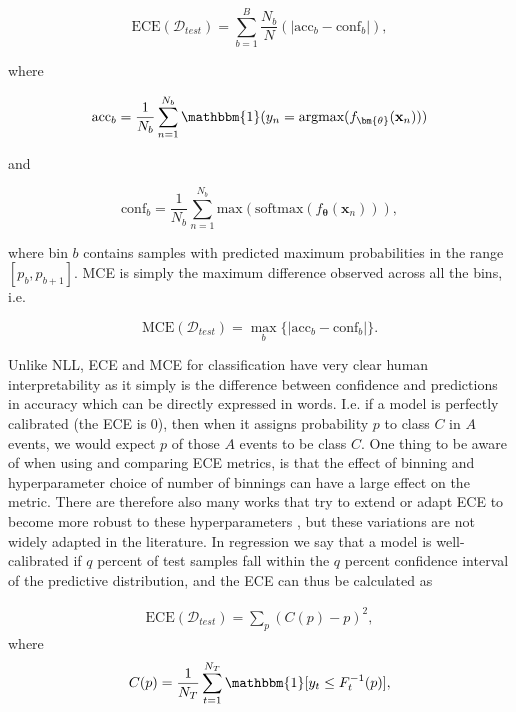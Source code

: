\begin{equation}
    \text{ECE}(\mathcal{D}_{test}) = \sum_{b=1}^{B}\frac{N_b}{N}(|\text{acc}_b - \text{conf}_b|),
\end{equation}

\noindent where 

\begin{equation}
    \text{acc}_b = \frac{1}{N_b}\sum^{N_b}_{n=1}\mathbbm{1}(y_{n}=\text{argmax}(f_{\bm{\theta}}(\mathbf{x}_n)))
\end{equation}

\noindent and

\begin{equation}
    \text{conf}_b = \frac{1}{N_b}\sum^{N_b}_{n=1}\text{max}(\text{softmax}(f_{\bm{\theta}}(\mathbf{x}_n))),
\end{equation}

\noindent where bin $b$ contains samples with predicted maximum probabilities in the range $[p_{b}, p_{b+1}]$. MCE is simply the maximum difference observed across all the bins, i.e.

\begin{equation}
    \text{MCE}(\mathcal{D}_{test}) = \max_b\{|\text{acc}_b - \text{conf}_b|\}.
\end{equation}

\noindent Unlike NLL, ECE and MCE for classification have very clear human interpretability as it simply is the difference between confidence and predictions in accuracy which can be directly expressed in words. I.e. if a model is perfectly calibrated (the ECE is $0$), then when it assigns probability $p$ to class $C$ in $A$ events, we would expect $p$ of those $A$ events to be class $C$. One thing to be aware of when using and comparing ECE metrics, is that the effect of binning and hyperparameter choice of number of binnings can have a large effect on the metric. There are therefore also many works that try to extend or adapt ECE to become more robust to these hyperparameters \citep{2019_ECEExtensions,2023_TCE,Futami2024InformationtheoreticGA}, but these variations are not widely adapted in the literature. In regression we say that a model is well-calibrated if $q$ percent of test samples fall within the $q$ percent confidence interval of the predictive distribution, and the ECE can thus be calculated as

\begin{align} 
    \text{ECE}(\mathcal{D}_{test}) = \sum_p (C(p) - p)^2,
\end{align}
where
\begin{equation}\label{eq:Cy}
    C(p) = \frac{1}{N_T} \sum_{t=1}^{N_T} \mathbbm{1} [ y_t  \leq F_t^{-1}(p) ],
\end{equation}

